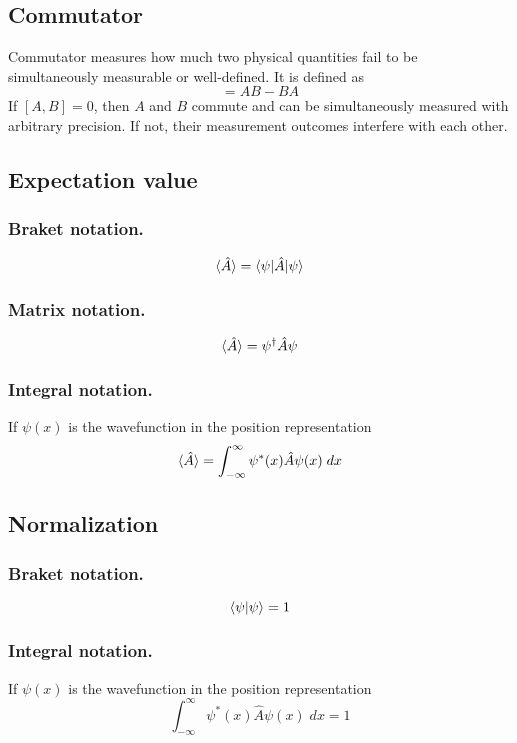 \documentclass[../../../main.tex]{subfiles}
\begin{document}
\subsection*{Commutator}
Commutator measures how much two physical quantities fail to be simultaneously measurable or well-defined. It is defined as 
\begin{equation*}
    [A,B]=AB-BA
\end{equation*}
If $[A,B]=0$, then $A$ and $B$ commute and can be simultaneously measured with arbitrary precision. If not, their measurement outcomes interfere with each other.

\subsection*{Expectation value}
\subsubsection*{Braket notation.}
\begin{equation*}
    \braket{\hat{A}}=\braket{\psi|\hat{A}|\psi}
\end{equation*}

\subsubsection*{Matrix notation.}
\begin{equation*}
    \braket{\hat{A}}=\psi^{\dagger}\hat{A}\psi
\end{equation*}

\subsubsection*{Integral notation.} If $\psi(x)$ is the wavefunction in the position representation
\begin{equation*}
    \braket{\hat{A}}=\int_{-\infty}^{\infty}\psi^*(x)\hat{A}\psi(x)\;dx
\end{equation*}

\subsection*{Normalization}
\subsubsection*{Braket notation.}
\begin{equation*}
    \braket{\psi|\psi}=1
\end{equation*}

\subsubsection*{Integral notation.} If $\psi(x)$ is the wavefunction in the position representation
\begin{equation*}
    \int_{-\infty}^{\infty}\psi^*(x)\hat{A}\psi(x)\;dx=1
\end{equation*}
\end{document}
